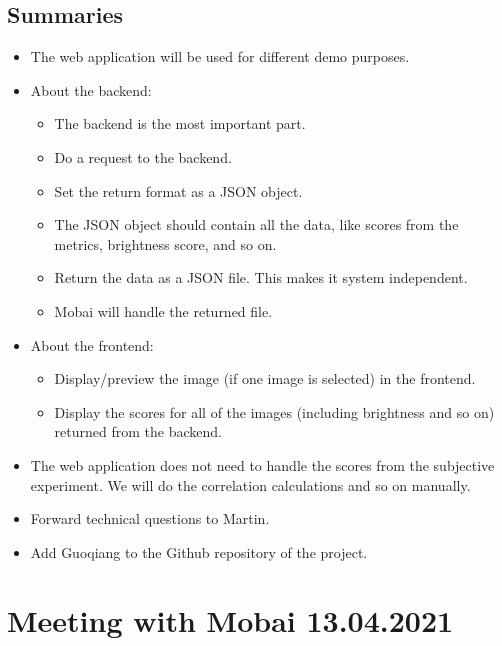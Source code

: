\subsection*{Summaries}
\begin{itemize}
    \item The web application will be used for different demo purposes.
    \item About the backend:
    \begin{itemize}
        \item The backend is the most important part.
        \item Do a request to the backend. 
        \item Set the return format as a JSON object.
        \item The JSON object should contain all the data, like scores from the metrics, brightness score, and so on.
        \item  Return the data as a JSON file. This makes it system independent.
        \item Mobai will handle the returned file.
        \end{itemize}
    \item About the frontend:
    \begin{itemize}
        \item Display/preview the image (if one image is selected) in the frontend.
        \item Display the scores for all of the images (including brightness and so on) returned from the backend.
    \end{itemize}
    \item The web application does not need to handle the scores from the subjective experiment. We will do the correlation calculations and so on manually.
    \item Forward technical questions to Martin.
    \item Add Guoqiang to the Github repository of the project.
\end{itemize}


\section*{Meeting with Mobai 13.04.2021}
